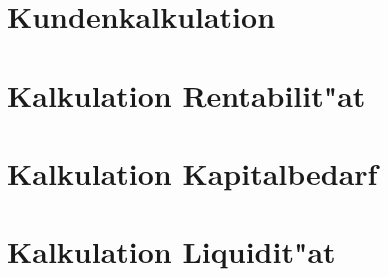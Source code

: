 \begin{appendix}
	\section{Kundenkalkulation}
	
	\section{Kalkulation Rentabilit"at}
	
	\section{Kalkulation Kapitalbedarf}
	
	\section{Kalkulation Liquidit"at}
\end{appendix}
